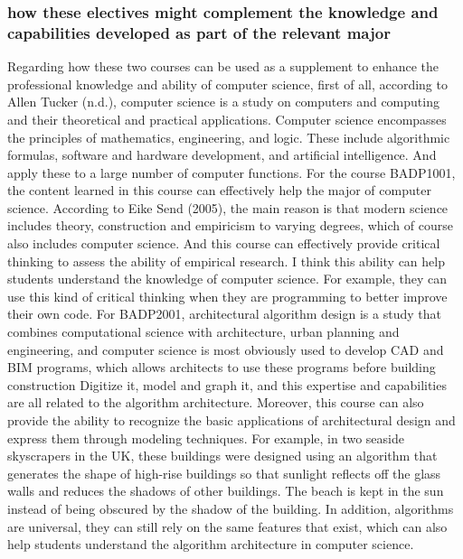 \documentclass[../draft.tex]{subfiles}
\begin{document}
\subsubsection{how these electives might complement the knowledge and capabilities developed as part of the relevant major}
Regarding how these two courses can be used as a supplement to enhance the professional knowledge and ability of computer science, first of all, according to Allen Tucker (n.d.), computer science is a study on computers and computing and their theoretical and practical applications. Computer science encompasses the principles of mathematics, engineering, and logic. These include algorithmic formulas, software and hardware development, and artificial intelligence. And apply these to a large number of computer functions. For the course BADP1001, the content learned in this course can effectively help the major of computer science. According to Eike Send (2005), the main reason is that modern science includes theory, construction and empiricism to varying degrees, which of course also includes computer science. And this course can effectively provide critical thinking to assess the ability of empirical research. I think this ability can help students understand the knowledge of computer science. For example, they can use this kind of critical thinking when they are programming to better improve their own code. For BADP2001, architectural algorithm design is a study that combines computational science with architecture, urban planning and engineering, and computer science is most obviously used to develop CAD and BIM programs, which allows architects to use these programs before building construction Digitize it, model and graph it, and this expertise and capabilities are all related to the algorithm architecture. Moreover, this course can also provide the ability to recognize the basic applications of architectural design and express them through modeling techniques. For example, in two seaside skyscrapers in the UK, these buildings were designed using an algorithm that generates the shape of high-rise buildings so that sunlight reflects off the glass walls and reduces the shadows of other buildings. The beach is kept in the sun instead of being obscured by the shadow of the building. In addition, algorithms are universal, they can still rely on the same features that exist, which can also help students understand the algorithm architecture in computer science.
\end{document}
